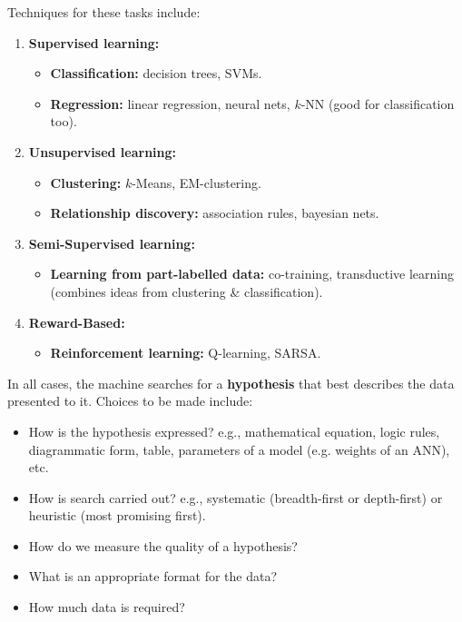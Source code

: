 \documentclass[a4paper,11pt]{article}
\begin{document}
Techniques for these tasks include:
\begin{enumerate}
    \item   \textbf{Supervised learning:}
            \begin{itemize}
                \item   \textbf{Classification:} decision trees, SVMs.
                \item   \textbf{Regression:} linear regression, neural nets, $k$-NN (good for classification too).
            \end{itemize}

    \item   \textbf{Unsupervised learning:}
            \begin{itemize}
                \item   \textbf{Clustering:} $k$-Means, EM-clustering.
                \item   \textbf{Relationship discovery:} association rules, bayesian nets.
            \end{itemize}

    \item   \textbf{Semi-Supervised learning:}
            \begin{itemize}
                \item   \textbf{Learning from part-labelled data:} co-training, transductive learning (combines ideas
                        from clustering \& classification).
            \end{itemize}

    \item   \textbf{Reward-Based:}
            \begin{itemize}
                \item   \textbf{Reinforcement learning:} Q-learning, SARSA.
            \end{itemize}
\end{enumerate}

In all cases, the machine searches for a \textbf{hypothesis} that best describes the data presented to it.
Choices to be made include:
\begin{itemize}
    \item   How is the hypothesis expressed? e.g., mathematical equation, logic rules, diagrammatic form, table, 
            parameters of a model (e.g. weights of an ANN), etc.
    \item   How is search carried out? e.g., systematic (breadth-first or depth-first) or heuristic (most promising
            first).
    \item   How do we measure the quality of a hypothesis?
    \item   What is an appropriate format for the data?
    \item   How much data is required?
\end{itemize}
\end{document}
